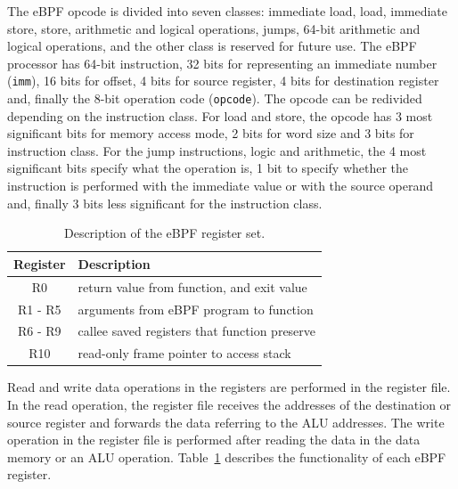 The eBPF opcode is divided into seven classes: immediate load, load, immediate store, store, arithmetic and logical operations, jumps, 64-bit arithmetic and logical operations, and the other class is reserved for future use. The eBPF processor has 64-bit instruction, 32 bits for representing an immediate number (\texttt{imm}), 16 bits for offset, 4 bits for source register, 4 bits for destination register and, finally the 8-bit operation code (\texttt{opcode}). The opcode can be redivided depending on the instruction class. For load and store, the opcode has 3 most significant bits for memory access mode, 2 bits for word size and 3 bits for instruction class. For the jump instructions, logic and arithmetic, the 4 most significant bits specify what the operation is, 1 bit to specify whether the instruction is performed with the immediate value or with the source operand and, finally 3 bits less significant for the instruction class.

\begin{table}[tb]
\centering
\caption{Description of the eBPF register set.}
\label{tab:eBPFreg}
\begin{tabular}{|c|l|}
\hline
\textbf{Register} & \textbf{Description} \\
\hline
R0 & return value from function, and exit value\\
\hline
R1 - R5 & arguments from eBPF program to function\\
\hline
R6 - R9 & callee saved registers that function preserve\\
\hline
R10 & read-only frame pointer to access stack\\
\hline
\end{tabular}
\end{table}

Read and write data operations in the registers are performed in the register file. 
In the read operation, the register file receives the addresses of the destination or source register and forwards the data referring to the ALU addresses. The write operation in the register file is performed after reading the data in the data memory or an ALU operation.
Table~\ref{tab:eBPFreg} describes the functionality of each eBPF register.

%


